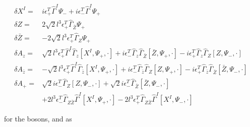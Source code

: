 \documentclass[12pt]{article}
\newcommand{\nn}{\nonumber}
\numberwithin{equation}{section}
\begin{document}
\begin{align}
\delta X^I =& i \epsilon^T_+ \hat{\Gamma}^I \Psi_- + i \epsilon^T_- \hat{\Gamma}^I \Psi_+\nn\\
\delta Z =& 2 \sqrt{2} l^3 \epsilon^T_+ \hat{\Gamma}_{\bar{Z}} \Psi_{+}
\nn\\
\delta \bar{Z} =& - 2 \sqrt{2} l^3 \epsilon^T_+ \hat{\Gamma}_{Z} \Psi_{+}
\nn \\
\delta A_{z} =&   \sqrt{2} l^3 \epsilon_+^T \hat{\Gamma}^I \hat{\Gamma}_z [X^I, \Psi_+, \cdot]  +   i \epsilon^T_- \hat{\Gamma}_z \hat{\Gamma}_{\bar{Z}} \left[ \bar{Z}, \Psi_+, \cdot  \right] - i \epsilon^T_+ \hat{\Gamma}_z \hat{\Gamma}_{Z} \left[ Z, \Psi_-, \cdot  \right]
\nn\\
\delta A_{\bar{z}} =& -\sqrt{2} l^3 \epsilon_+^T \hat{\Gamma}^I \hat{\Gamma}_{\bar{z}} [X^I, \Psi_+, \cdot] +   i \epsilon^T_- \hat{\Gamma}_{\bar{z}} \hat{\Gamma}_{Z} \left[ Z, \Psi_+, \cdot  \right] - i \epsilon^T_+ \hat{\Gamma}_{\bar{z}} \hat{\Gamma}_{\bar{Z}} \left[ \bar{Z}, \Psi_-, \cdot  \right]
\nn \\
\delta A_+ =&  \sqrt{2} i \epsilon^T_- \hat{\Gamma}_Z \left[ Z, \Psi_-, \cdot \right] + \sqrt{2} i \epsilon^T_- \hat{\Gamma}_{\bar{Z}} \left[ \bar{Z}, \Psi_-, \cdot \right] \nonumber \\  & + 2l^3 \epsilon^T_- \hat{\Gamma}_{Z \bar{Z}} \hat{\Gamma}^I \left[X^I, \Psi_+, \cdot  \right] - 2l^3 \epsilon^T_+ \hat{\Gamma}_{Z \bar{Z}} \hat{\Gamma}^I \left[X^I, \Psi_-, \cdot  \right]
\end{align}

for the bosons, and as
\end{document}
